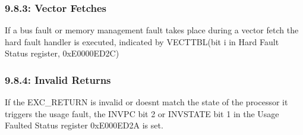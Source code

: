 \documentclass[12pt]{article}
\begin{document}
\subsubsection*{9.8.3: Vector Fetches}
If a bus fault or memory management fault takes place during a vector fetch the hard fault handler is executed, indicated by VECTTBL(bit i in Hard Fault Status register, 0xE0000ED2C)

\subsubsection*{9.8.4: Invalid Returns}
If the EXC\_RETURN is invalid or doesnt match the state of the processor it triggers the usage fault, the INVPC bit 2 or INVSTATE bit 1 in the Usage Faulted Status register 0xE000ED2A is set.
\end{document}
